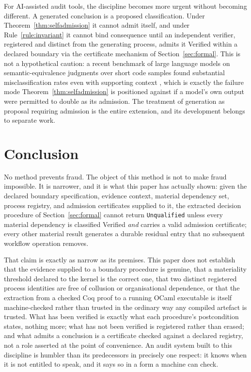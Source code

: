 \documentclass[smallcondensed,envcountsect,natbib]{svjour3}
\newcommand{\state}[1]{\textsf{#1}}
\begin{document}
For AI-assisted audit tools, the discipline becomes more urgent without becoming different. A generated conclusion is a proposed classification. Under Theorem~\ref{thm:selfadmission} it cannot admit itself, and under Rule~\ref{rule:invariant} it cannot bind consequence until an independent verifier, registered and distinct from the generating process, admits it \state{Verified} within a declared boundary via the certificate mechanism of Section~\ref{sec:formal}. This is not a hypothetical caution: a recent benchmark of large language models on semantic-equivalence judgments over short code samples found substantial misclassification rates even with supporting context \citep{laneve2026}, which is exactly the failure mode Theorem~\ref{thm:selfadmission} is positioned against if a model's own output were permitted to double as its admission. The treatment of generation as proposal requiring admission is the entire extension, and its development belongs to separate work.

\section{Conclusion}
\label{sec:conclusion}

No method prevents fraud. The object of this method is not to make fraud impossible. It is narrower, and it is what this paper has actually shown: given the declared boundary specification, evidence context, material dependency set, process registry, and admission certificates supplied to it, the extracted decision procedure of Section~\ref{sec:formal} cannot return \texttt{Unqualified} unless every material dependency is classified \state{Verified} \emph{and} carries a valid admission certificate; every other material result generates a durable residual entry that no subsequent workflow operation removes.

That claim is exactly as narrow as its premises. This paper does not establish that the evidence supplied to a boundary procedure is genuine, that a materiality threshold declared to the kernel is the correct one, that two distinct registered process identities are free of collusion or organisational dependence, or that the extraction from a checked Coq proof to a running OCaml executable is itself machine-checked rather than trusted in the ordinary way any compiled artefact is trusted. What has been verified is exactly what each procedure's postcondition states, nothing more; what has not been verified is registered rather than erased; and what admits a conclusion is a certificate checked against a declared registry, not a role asserted at the point of convenience. An audit system built to this discipline is humbler than its predecessors in precisely one respect: it knows when it is not entitled to speak, and it says so in a form a machine can check.
\end{document}
